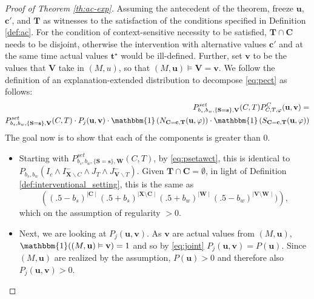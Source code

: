 \documentclass[anon,12pt]{clear2025} %
\begin{document}
\begin{proof}[Proof of Theorem \ref{th:ac-exp}]  Assuming the antecedent of the theorem, freeze $\mathbf{u}$, $\mathbf{c'}$, and $\mathbf{T}$ as witnesses to the satisfaction of the conditions specified in Definition \ref{def:ac}. For the condition of context-sensitive necessity to be satisfied, $\mathbf{T} \cap \mathbf{C}$ needs to be disjoint, otherwise the intervention with alternative values $\mathbf{c'}$ and at the same time actual values $\mathbf{t^\star}$ would be ill-defined. Further, set $\mathbf{v}$ to be the values that $\mathbf{V}$ take in  $(M,u)$, so that $(M, \mathbf{u}) \models \mathbf{V} = \mathbf{v}$.  
We follow the definition of an explanation-extended distribution to decompose \eqref{eq:pect} as follows:
\begin{align}
    P^{\mathit{set}}_{b_s,b_w, \{\mathbf{S}=\mathbf{s}\}, \mathbf{V}}(C,T)  P^C_{C, T, \varphi} (\mathbf{u}, \mathbf{v}) = \\
      P^{\mathit{set}}_{b_s,b_w, \{\mathbf{S}=\mathbf{s}\}, \mathbf{V}}(C,T) \cdot P_j(\mathbf{u}, \mathbf{v}) \cdot \mathbbm{1}\left(N_{\mathbf{C} = \mathbf{c}, \mathbf{T}}(\mathbf{u}, \varphi)\right) \cdot \mathbbm{1}\left(S_{\mathbf{C} = \mathbf{c}, \mathbf{T}}(\mathbf{u}, \varphi)\right) \label{eq:decomposition}
\end{align}
\noindent The goal now is to show that each of the components is greater than 0.

\begin{itemize}
\item Starting with $P^{\mathit{set}}_{b_s,b_w, \{\mathbf{S}=\mathbf{s}\}, \mathbf{W}}(C,T)$, by \eqref{eq:psetawct}, this is identical to \linebreak  $P_{b_s, b_w}\left(I_c \wedge I^-_{\mathbf{X} \backslash C}  \wedge  J_T  \wedge J^-_{\mathbf{V} \backslash T} \right)$. Given  $\mathbf{T} \cap \mathbf{C} = \emptyset$, in light of Definition \ref{def:interventional_setting}, this is the same as 
\[\left( (.5-b_s)^{\mid \mathbf{C}\mid}   (.5+b_s)^{\mid \mathbf{X}\setminus \mathbf{C}\mid} (.5+b_w)^{\mid \mathbf{W}\mid} (.5-b_w)^{\mid \mathbf{V}\setminus \mathbf{W}\mid} )  \right),\] which on the assumption of regularity $>0$.

\item Next, we are looking at $P_j(\mathbf{u}, \mathbf{v})$. As $\mathbf{v}$ are actual values from $(M,\mathbf{u})$,  $\mathbbm{1}((M, \mathbf{u}) \vDash \mathbf{v})=1$ and so by \eqref{eq:joint}  $P_j(\mathbf{u}, \mathbf{v}) = P(\mathbf{u})$. Since $(M, \mathbf{u})$ are realized by the assumption, $P(\mathbf{u}) > 0$ and therefore also $P_j(\mathbf{u}, \mathbf{v})>0$. 


\end{itemize}
\end{proof}
\end{document}
